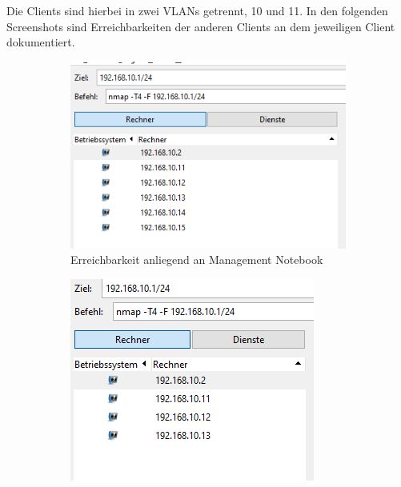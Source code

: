         \newpage
        Die Clients sind hierbei in zwei VLANs getrennt, 10 und 11. In den folgenden Screenshots sind Erreichbarkeiten
        der anderen Clients an dem jeweiligen Client dokumentiert.
        \begin{figure}[H]
        \centering
            \begin{subfigure}{.45\linewidth}
                \centering
                \includegraphics[width=\linewidth]{images/Trennung durch VLAN herstellen/ErreichbarkeitAnliegendAn11.png}
                \caption{Erreichbarkeit anliegend an Management Notebook}
            \end{subfigure}
            \begin{subfigure}{.45\linewidth}
                \centering
                \includegraphics[width=\linewidth]{images/Trennung durch VLAN herstellen/ErreichbarkeitAnliegendAn12.png}

\end{subfigure}
\end{figure}
